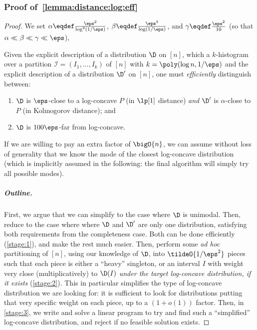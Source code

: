 \subsubsection{Proof of~\cref{lemma:distance:log:eff}}\label{app:structural:projection:proofs:log}

\lemmaefficientdistancelog*
\begin{proof}
We set $\alpha \eqdef \frac{\eps^2}{\log^2(1/\eps)}$, $\beta \eqdef \frac{\eps^2}{\log(1/\eps)}$, and $\gamma \eqdef \frac{\eps^2}{10}$ (so that $\alpha \ll \beta \ll \gamma \ll \eps$),

Given the explicit description of a distribution $\D$ on $[n]$, which a $k$-histogram over a partition $\mathcal{I}=(I_1,\dots, I_k)$ of $[n]$ with $k=\poly(\log n, 1/\eps)$ and the explicit description of a distribution $\D^\prime$ on $[n]$, one must \emph{efficiently} distinguish between:
\begin{enumerate}[\sf(a)]
  \item $\D$ is $\eps$-close to a log-concave $P$ (in $\lp[1]$ distance) \emph{and} $\D^\prime$ is $\alpha$-close to $P$ (in Kolmogorov distance); and
  \item $\D$ is $100\eps$-far from log-concave.
\end{enumerate} 
If we are willing to pay an extra factor of $\bigO{n}$, we can assume without loss of generality that we know the mode of the closest log-concave distribution (which is implicitly assumed in the following: the final algorithm will simply try all possible modes).

\subparagraph{Outline.} First, we argue that we can simplify to the case where $\D$ is unimodal. Then, reduce to the case where where $\D$ and $\D^\prime$ are only one distribution, satisfying both requirements from the completeness case. Both can be done efficiently (\cref{stage:1}), and make the rest much easier.
Then, perform some \emph{ad hoc} partitioning of $[n]$, using our knowledge of $\D$, into $\tildeO{1/\eps^2}$ pieces such that each piece is either a ``heavy'' singleton, or an interval $I$ with weight very close (multiplicatively) to $\D(I)$ \emph{under the target log-concave distribution, if it exists} (\cref{stage:2}). This in particular simplifies the type of log-concave distribution we are looking for: it is sufficient to look for distributions putting that very specific weight on each piece, up to a $(1+o(1))$ factor. Then, in \cref{stage:3}, we write and solve a linear program to try and find such a ``simplified'' log-concave distribution, and reject if no feasible solution exists.


\end{proof}
